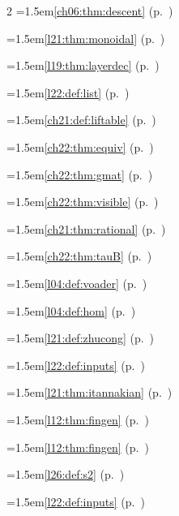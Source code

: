 \begin{multicols}{2}
\hangindent=1.5em\quad \ref{ch06:thm:descent} (p.~\pageref{ch06:thm:descent})\par
\hangindent=1.5em\quad \ref{l21:thm:monoidal} (p.~\pageref{l21:thm:monoidal})\par
\hangindent=1.5em\quad \ref{l19:thm:layerdec} (p.~\pageref{l19:thm:layerdec})\par
\hangindent=1.5em\quad \ref{l22:def:list} (p.~\pageref{l22:def:list})\par
\hangindent=1.5em\quad \ref{ch21:def:liftable} (p.~\pageref{ch21:def:liftable})\par
\hangindent=1.5em\quad \ref{ch22:thm:equiv} (p.~\pageref{ch22:thm:equiv})\par
\hangindent=1.5em\quad \ref{ch22:thm:gmat} (p.~\pageref{ch22:thm:gmat})\par
\hangindent=1.5em\quad \ref{ch22:thm:visible} (p.~\pageref{ch22:thm:visible})\par
\hangindent=1.5em\quad \ref{ch21:thm:rational} (p.~\pageref{ch21:thm:rational})\par
\hangindent=1.5em\quad \ref{ch22:thm:tauB} (p.~\pageref{ch22:thm:tauB})\par
\hangindent=1.5em\quad \ref{l04:def:voader} (p.~\pageref{l04:def:voader})\par
\hangindent=1.5em\quad \ref{l04:def:hom} (p.~\pageref{l04:def:hom})\par
\hangindent=1.5em\quad \ref{l21:def:zhucong} (p.~\pageref{l21:def:zhucong})\par
\hangindent=1.5em\quad \ref{l22:def:inputs} (p.~\pageref{l22:def:inputs})\par
\hangindent=1.5em\quad \ref{l21:thm:itannakian} (p.~\pageref{l21:thm:itannakian})\par
\hangindent=1.5em\quad \ref{l12:thm:fingen} (p.~\pageref{l12:thm:fingen})\par
\hangindent=1.5em\quad \ref{l12:thm:fingen} (p.~\pageref{l12:thm:fingen})\par
\hangindent=1.5em\quad \ref{l26:def:s2} (p.~\pageref{l26:def:s2})\par
\hangindent=1.5em\quad \ref{l22:def:inputs} (p.~\pageref{l22:def:inputs})\par

\end{multicols}
